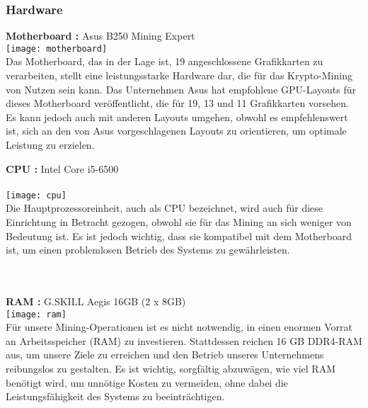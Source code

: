\documentclass[ngerman]{scrreprt}
\begin{document}
\subsubsection{Hardware}
\begin{large}
	\textbf{Motherboard :} Asus B250 Mining Expert \\
	\texttt{[image: motherboard]}  \\
	Das Motherboard, das in der Lage ist, 19 angeschlossene Grafikkarten zu verarbeiten, stellt eine leistungsstarke Hardware dar, die für das Krypto-Mining von Nutzen sein kann. Das Unternehmen Asus hat empfohlene GPU-Layouts für dieses Motherboard veröffentlicht, die für 19, 13 und 11 Grafikkarten vorsehen. Es kann jedoch auch mit anderen Layouts umgehen, obwohl es empfehlenswert ist, sich an den von Asus vorgeschlagenen Layouts zu orientieren, um optimale Leistung zu erzielen. \cite{zdnet}
	
\end{large}
\newpage
\begin{large}
	\textbf{CPU :} Intel Core i5-6500 \\ \\
	\texttt{[image: cpu]}  \\ 
	Die Hauptprozessoreinheit, auch als CPU bezeichnet, wird auch für diese Einrichtung in Betracht gezogen, obwohl sie für das Mining an sich weniger von Bedeutung ist. Es ist jedoch wichtig, dass sie kompatibel mit dem Motherboard ist, um einen problemlosen Betrieb des Systems zu gewährleisten. \\ \\ \\
	
\end{large}
\begin{large}
	\textbf{RAM :} G.SKILL Aegis 16GB (2 x 8GB) \\ 
	\texttt{[image: ram]}  \\
	Für unsere Mining-Operationen ist es nicht notwendig, in einen enormen Vorrat an Arbeitsspeicher (RAM) zu investieren. Stattdessen reichen 16 GB DDR4-RAM aus, um unsere Ziele zu erreichen und den Betrieb unseres Unternehmens reibungslos zu gestalten. Es ist wichtig, sorgfältig abzuwägen, wie viel RAM benötigt wird, um unnötige Kosten zu vermeiden, ohne dabei die Leistungsfähigkeit des Systems zu beeinträchtigen. \\
	
\end{large}
\end{document}
